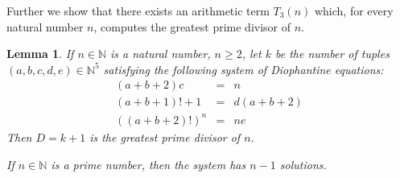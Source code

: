 \documentclass[10pt]{article}
\theoremstyle{plain}
\newtheorem{lemma}{Lemma}[section]
\begin{document}
Further we show that there exists an arithmetic term $T_3(n)$ which, for every natural number $n$, computes the greatest prime divisor of $n$.

\begin{lemma}\label{lemmabiggestprimedivisor}
     If $n \in \mathbb N$ is a natural number, $n \geq 2$, let $k$ be the number of tuples $(a, b, c, d, e) \in \mathbb N^5$ satisfying the following system of Diophantine equations:
    \begin{eqnarray*}
    (a+b+2)c &=& n \\
    (a+b+1)! + 1 &=& d (a+b+2) \\
    ((a+b+2)!)^n &=& n e
    \end{eqnarray*}
        Then $D = k+1$ is the greatest prime divisor of $n$.

        If $n \in \mathbb N$ is a prime number, then the system has $n-1$ solutions.
\end{lemma}
\end{document}
